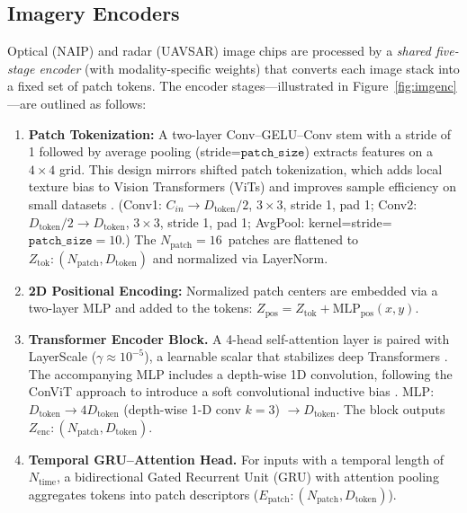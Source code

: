 \documentclass[12pt]{report}
\begin{document}
\subsection{Imagery Encoders}
\label{sec:img_enc}




Optical (NAIP) and radar (UAVSAR) image chips are processed by a \emph{shared five-stage encoder} (with modality-specific weights) that converts each image stack into a fixed set of patch tokens. The encoder stages—illustrated in Figure~\ref{fig:imgenc}—are outlined as follows:

\begin{enumerate}[leftmargin=*]
\item \textbf{Patch Tokenization:}
      A two-layer Conv–GELU–Conv stem with a stride of 1
      followed by average pooling (stride=$\texttt{patch\_size}$) extracts features on a $4\times4$ grid. This design mirrors shifted patch tokenization, which adds local texture bias to Vision Transformers (ViTs) and improves sample efficiency on small datasets \cite{lee2021vision}.
 (Conv1: $C_{in}\rightarrow D_{\text{token}}/2$, $3\times3$, stride 1, pad 1; Conv2: $D_{\text{token}}/2\rightarrow D_{\text{token}}$, $3\times3$, stride 1, pad 1; AvgPool: kernel=stride=$\texttt{patch\_size}=10$.) The \mbox{$N_{\text{patch}}=16$ patches} are flattened to $Z_{\text{tok}}: (N_{\text{patch}}, D_{\text{token}})$ and normalized via LayerNorm.


\item \textbf{2D Positional Encoding:}
      Normalized patch centers are embedded via a two-layer MLP and added to the tokens: $Z_{\text{pos}} = Z_{\text{tok}} + \text{MLP}_{\text{pos}}(x,y)$.

\item \textbf{Transformer Encoder Block.}
      A 4-head self-attention layer is paired with LayerScale ($\gamma \approx 10^{-5}$), a learnable scalar that stabilizes deep Transformers \cite{touvron2021going}. The accompanying MLP includes a depth-wise 1D convolution, following the ConViT approach to introduce a soft convolutional inductive bias \cite{dascoli2021convit}. MLP: $D_{\text{token}} \rightarrow 4 D_{\text{token}}$ (depth-wise 1-D conv $k=3$) $\rightarrow D_{\text{token}}$. The block outputs $Z_{\text{enc}}: (N_{\text{patch}}, D_{\text{token}})$.



\item \textbf{Temporal GRU–Attention Head.}
      For inputs with a temporal length of $N_{\text{time}}$, a bidirectional Gated Recurrent Unit (GRU) with attention pooling aggregates tokens into patch descriptors ($E_{\text{patch}}: (N_{\text{patch}}, D_{\text{token}})$).
\end{enumerate}
\end{document}
